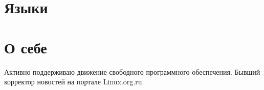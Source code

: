 \section{Языки}

\section{О себе}

Активно поддерживаю движение свободного программного обеспечения. Бывший корректор новостей на
портале Linux.org.ru.
